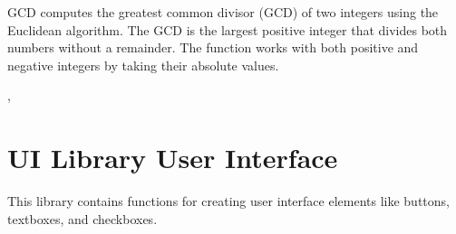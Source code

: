 \documentclass[letterpaper,10pt,english]{sphinxmanual}
\begin{document}
\sphinxAtStartPar
{}

\sphinxAtStartPar
GCD computes the greatest common divisor (GCD) of two integers using the Euclidean algorithm. The GCD is the largest positive integer that divides both numbers without a remainder. The function works with both positive and negative integers by taking their absolute values.

\sphinxAtStartPar
{}

\begin{sphinxVerbatim}[commandchars=\\\{\}]
\end{sphinxVerbatim}

\sphinxAtStartPar
{}

\begin{sphinxVerbatim}[commandchars=\\\{\}]
\end{sphinxVerbatim}

\sphinxAtStartPar
{}

\sphinxAtStartPar
{}, 

\sphinxstepscope


\section{UI Library \sphinxhyphen{} User Interface}
\label{\detokenize{reference/ui:ui-library-user-interface}}\label{\detokenize{reference/ui::doc}}
\sphinxAtStartPar
This library contains functions for creating user interface elements like buttons, textboxes, and checkboxes.
\end{document}
